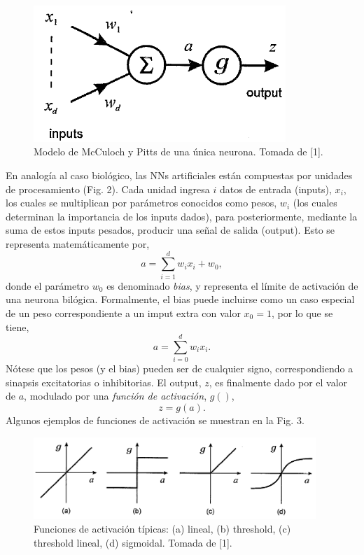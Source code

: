 \documentclass{article}
\begin{document}
\begin{figure}[th!]
   \includegraphics[width=0.85\textwidth]{unit.png}
   \caption{Modelo de McCuloch y Pitts de una única neurona. Tomada de [1].}
\end{figure}

En analogía al caso biológico, las NNs artificiales están compuestas por unidades de procesamiento (Fig. 2). Cada unidad ingresa $i$ datos de entrada (inputs), $x_i$, los cuales se multiplican por parámetros conocidos como pesos, $w_i$ (los cuales determinan la importancia de los inputs dados), para posteriormente, mediante la suma de estos inputs pesados, producir una señal de salida (output). Esto se representa matemáticamente por, 
\begin{equation}
    a=\sum^{d}_{i=1} w_i x_i + w_0,
\end{equation}
donde el parámetro $w_0$ es denominado \textit{bias}, y representa el límite de activación de una neurona bilógica. Formalmente, el bias puede incluirse como un caso especial de un peso correspondiente a un imput extra con valor $x_0=1$, por lo que se tiene,
\begin{equation}
    a=\sum^{d}_{i=0} w_i x_i.
\end{equation}
Nótese que los pesos (y el bias) pueden ser de cualquier signo, correspondiendo a sinapsis excitatorias o inhibitorias. El output, $z$, es finalmente dado por el valor de $a$, modulado por una \textit{función de activación}, $g()$,
\begin{equation}
   z=g(a). 
\end{equation}
Algunos ejemplos de funciones de activación se muestran en la Fig. 3.\\

\begin{figure}[th!]
   \includegraphics[width=0.95\textwidth]{act.png}
   \caption{Funciones de activación típicas: (a) lineal, (b) threshold, (c) threshold lineal, (d) sigmoidal. Tomada de [1].}
\end{figure}
\end{document}
